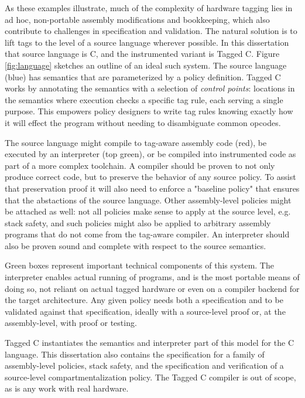 As these examples illustrate, much of the complexity of hardware tagging lies in ad hoc,
non-portable assembly modifications and bookkeeping, which also contribute to challenges in
specification and validation. The natural solution is to lift
tags to the level of a source language wherever possible. In this dissertation that source language is C,
and the instrumented variant is Tagged C. Figure \ref{fig:language}
sketches an outline of an ideal such system. The source language (blue) has semantics that are
parameterized by a policy definition. Tagged C works by annotating the
semantics with a selection of {\em control points}: locations
in the semantics where execution checks a specific tag rule, each serving a single purpose.
This empowers policy designers to write tag rules knowing exactly how it will effect the
program without needing to disambiguate common opcodes.

The source language might compile to tag-aware assembly code (red), be executed by an
interpreter (top green), or be compiled into instrumented code as part of a more
complex toolchain. A compiler should be proven to not only
produce correct code, but to preserve the behavior of any source policy. To assist that preservation
proof it will also need to enforce a "baseline policy" that ensures that the abstactions of the
source language. Other assembly-level policies might be attached as well: not all policies make sense
to apply at the source level, e.g. stack safety, and such policies might also be applied to
arbitrary assembly programs that do not come from the tag-aware compiler.
An interpreter should also be proven sound and complete with respect to the source semantics.

Green boxes represent important technical components of this system. The interpreter enables
actual running of programs, and is the most portable means of doing so, not reliant on actual
tagged hardware or even on a compiler backend for the target architecture.
Any given policy needs both a specification and to be validated against that specification,
ideally with a source-level proof or, at the assembly-level, with proof or testing.

Tagged C instantiates the semantics and interpreter part of this model for the C language.
This dissertation also contains the specification for a family of assembly-level policies,
stack safety, and the specification and verification of a source-level compartmentalization
policy. The Tagged C compiler is out of scope, as is any work with real hardware.

